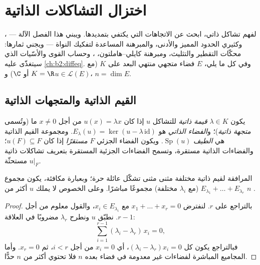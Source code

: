 \chapter{اختزال التشاكلات الذاتية}\label{ch:b2:reduction}

لفهم تشاكل ذاتي، ابحث عن الاتجاهات التي يكتفي بتمديدها.
ويبني هذا الفصل الآلة --- ، وكثيري الحدود المميز
والأدنى، والمبرهنة المساعدة لتفكيك النواة --- ويجني ثمارها:
محكّات التقطير والتثليث، ومبرهنة كايلي--هاملتون، ،
وحساب القوى والأسّيات الذي سيتغذّى عليه
\cref{ch:b2:diffeq}. وفي كل ما يلي، $E$ فضاء متجهي منتهي
البعد على $K$ (مع $K = \R$ أو $\C$) و$u \in
\mathcal{L}(E)$، $n = \dim E$.

\section{القيم الذاتية والمتجهات الذاتية}

\begin{definition}\label{def:b2:reduction:eigen}
يكون $\lambda \in K$ \emph{قيمة ذاتية} للتشاكل $u$
إذا كان $u(x) = \lambda x$ من أجل $x \neq 0$ ما (وتُسمى
\emph{متجهة ذاتية})؛ و\emph{الفضاء الذاتي} هو $E_\lambda(u) =
\ker(u - \lambda\,\mathrm{id})$. ومجموعة القيم الذاتية هي
\emph{الطيف} $\operatorname{Sp}(u)$. ويكون الفضاء الجزئي $F$
\emph{مستقرًا} إذا كان $u(F) \subseteq F$؛ والفضاءات الذاتية مستقرة،
وتسمح الفضاءات الجزئية المستقرة بتعريف تشاكلات ذاتية مستحثّة $u|_F$.
\end{definition}

\begin{theorem}\label{thm:b2:reduction:independence}
 المرافقة لقيم ذاتية مختلفة مثنى مثنى تشكّل
عائلة حرة؛ وبعبارة مكافئة، يكون مجموع 
$E_{\lambda_1} + \dots + E_{\lambda_r}$ (مع $\lambda_i$ مختلفة) مجموعًا
مباشرًا. وعلى الخصوص لا يملك $u$ أكثر من $n$ .
\end{theorem}

\begin{proof}
بالتراجع على $r$. لنفترض $x_1 + \dots + x_r = 0$ مع $x_i \in
E_{\lambda_i}$، والقول معلوم من أجل $r - 1$. نطبّق $u$ ونطرح
$\lambda_r$ مضروبًا في العلاقة:
\[
\sum_{i=1}^{r-1} (\lambda_i - \lambda_r)\, x_i = 0 ,
\]
فبالتراجع يكون كل $(\lambda_i - \lambda_r)x_i = 0$، أي $x_i =
0$ من أجل $i < r$، ثم $x_r = 0$. وأما المجاميع المباشرة لفضاءات غير معدومة في
فضاء بعده $n$ فلا تحتوي أكثر من $n$ حدًّا.
\end{proof}

